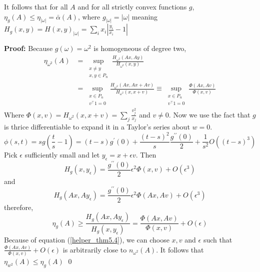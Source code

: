 It follows that for all $A$ and for all strictly convex functions $g$, $\eta_g(A) \leq \eta_{|\omega|} = \bar{\alpha}(A)$, where $g_{|\omega|} = |\omega|$ meaning $H_g(x,y) = H(x,y)_{|\omega|} = \sum_i x_i \left|\frac{y_i}{x_i} - 1\right|$
\addtocounter{defc}{3}
\label{thm5.4}
\noindent\textbf{Proof:}
Because $g(\omega) = \omega^2$ is homogeneous of degree two,
\begin{align}
    \eta_{\omega^2}(A) &= \sup_{\substack{x \neq y \\x,y \in P_n}} \frac{H_{\omega^2}(Ax, Ay)}{H_{\omega^2}(x,y)} \nonumber\\
    &= \sup_{\substack{x \in P_n \\ v^\top 1 = 0}} \frac{H_{\omega^2}(Ax, Ax + Av)}{H_{\omega^2}(x, x + v)} \equiv \sup_{\substack{x \in P_n \\ v^\top 1 = 0}}\frac{\Phi(Ax, Av)}{\Phi(x,v)} \label{helper_thm5.4}
\end{align}
Where $\Phi(x,v) = H_{\omega^2}(x, x + v) = \sum_j \frac{v_j^2}{x_j}$ and $v \neq 0$. Now we use the fact that $g$ is thrice differentiable to expand it in a Taylor's series about $w = 0$.
\[\phi(s,t) = sg\left(\frac{t}{s} - 1\right) = (t-s)g^\prime(0) + \frac{(t - s)^2}{s}\frac{g^{\prime\prime}(0)}{2} + \frac{1}{s^2}O\left((t - s)^3\right)\]
Pick $\epsilon$ sufficiently small and let $y_\epsilon = x + \epsilon v$. Then \[H_g(x, y_\epsilon) = \frac{g^{\prime\prime}(0)}{2}\epsilon^2 \Phi(x,v) + O(\epsilon^3)\] and 
\[H_g(Ax, Ay_\epsilon) = \frac{g^{\prime\prime}(0)}{2}\epsilon^2 \Phi(Ax,Av) + O(\epsilon^3)\] therefore,
\[\eta_g(A) \geq \frac{H_g(Ax, Ay_\epsilon)}{H_g(x, y_\epsilon)}=\frac{\Phi(Ax, Av)}{\Phi(x,v)} + O(\epsilon)\]
Because of equation (\ref{helper_thm5.4}), we can choose $x, v$ and $\epsilon$ such that $\frac{\Phi(Ax, Av)}{\Phi(x,v)} + O(\epsilon)$ is arbitrarily close to $n_{\omega^2}(A)$. It follows that $\eta_{w^2}(A) \leq \eta_g(A)$ \qed
\addtocounter{section}{-2}

